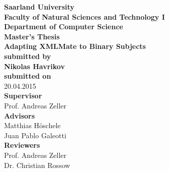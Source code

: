 \begin{titlepage}
\begin{center}
{\LARGE \bfseries Saarland University \\
Faculty of Natural Sciences and Technology I \\[0.1cm]
Department of Computer Science}\\[2.5cm]

{\Large \bfseries Master's Thesis}\\[1cm]
{\LARGE \bfseries Adapting XMLMate to Binary Subjects}\\[2cm]
{\small \bfseries submitted by}\\[0.5cm]
{\large \bfseries Nikolas Havrikov}\\[1cm]
{\small \bfseries submitted on}\\
20.04.2015\\[2.5cm]
{\bfseries Supervisor}\\[0.2cm]
Prof. Andreas Zeller\\[1cm]
{\bfseries Advisors}\\[0.2cm]
Matthias Höschele\\[0.1cm]
Juan Pablo Galeotti\\[1cm]
{\bfseries Reviewers}\\[0.2cm]
Prof. Andreas Zeller\\[0.1cm]
Dr. Christian Rossow
\end{center}
\end{titlepage}